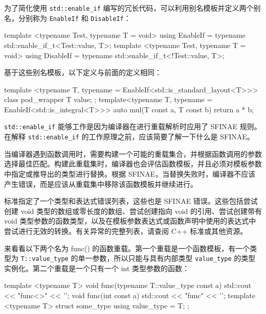 为了简化使用 \verb|std::enable_if| 编写的冗长代码，可以利用别名模板并定义两个别名，分别称为 \verb|EnableIf| 和 \verb|DisableIf|：

\begin{cpp}
template <typename Test, typename T = void>
using EnableIf = typename std::enable_if_t<Test::value, T>;
template <typename Test, typename T = void>
using DisableIf = typename std::enable_if_t<!Test::value, T>;
\end{cpp}

基于这些别名模板，以下定义与前面的定义相同：

\begin{cpp}
template <typename T, typename = EnableIf<std::is_standard_layout<T>>>
class pod_wrapper
{
    T value;
};
template<typename T, typename = EnableIf<std::is_integral<T>>>
auto mul(T const a, T const b)
{
    return a * b;
}
\end{cpp}


\verb|std::enable_if| 能够工作是因为编译器在进行重载解析时应用了 SFINAE 规则。在解释 \verb|std::enable_if| 的工作原理之前，应该简要了解一下什么是 SFINAE。

当编译器遇到函数调用时，需要构建一个可能的重载集合，并根据函数调用的参数选择最佳匹配。构建此重载集时，编译器也会评估函数模板，并且必须对模板参数中指定或推导出的类型进行替换。根据 SFINAE，当替换失败时，编译器不应该产生错误，而是应该从重载集中移除该函数模板并继续进行。

\begin{myTip}
标准指定了一个类型和表达式错误列表，这些也是 SFINAE 错误。这些包括尝试创建 void 类型的数组或零长度的数组、尝试创建指向 void 的引用、尝试创建带有 void 类型参数的函数类型，以及在模板参数表达式或函数声明中使用的表达式中尝试进行无效的转换。有关异常的完整列表，请查阅 C++ 标准或其他资源。
\end{myTip}

来看看以下两个名为 func() 的函数重载。第一个重载是一个函数模板，有一个类型为 \verb|T::value_type| 的单一参数，所以只能与具有内部类型 \verb|value_type| 的类型实例化。第二个重载是一个只有一个 int 类型参数的函数：

\begin{cpp}
template <typename T>
void func(typename T::value_type const a)
{ std::cout << "func<>" << '\n'; }
void func(int const a)
{ std::cout << "func" << '\n'; }
template <typename T>
struct some_type
{
    using value_type = T;
};
\end{cpp}

